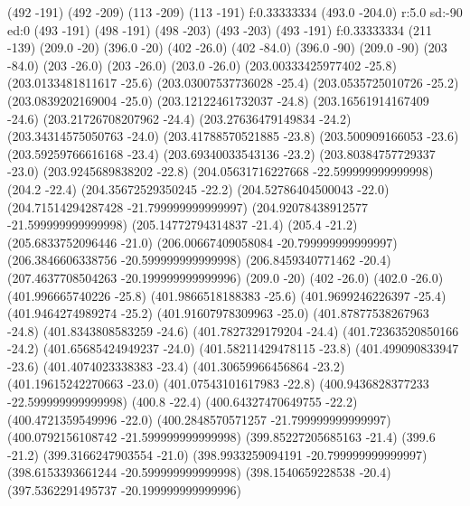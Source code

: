 {\lvec (492 -191)
\lvec (492 -209)
\lvec (113 -209)
\lvec (113 -191)
\lfill f:0.33333334
\move(493.0 -204.0)
\larc r:5.0 sd:-90 ed:0
\move (493 -191)
\lvec (498 -191)
\lvec (498 -203)
\lvec (493 -203)
\lvec (493 -191)
\lfill f:0.33333334
\htext (211 -139) {\matrixfontselect \color{white}{Array of Random Keys}}
\move (209.0 -20)
\lvec (396.0 -20)
\move (402 -26.0)
\lvec (402 -84.0)
\move (396.0 -90)
\lvec (209.0 -90)
\move (203 -84.0)
\lvec (203 -26.0)
\move (203 -26.0)
\lvec (203.0 -26.0)
\lvec (203.00333425977402 -25.8)
\lvec (203.0133481811617 -25.6)
\lvec (203.03007537736028 -25.4)
\lvec (203.0535725010726 -25.2)
\lvec (203.0839202169004 -25.0)
\lvec (203.12122461732037 -24.8)
\lvec (203.16561914167409 -24.6)
\lvec (203.21726708207962 -24.4)
\lvec (203.27636479149834 -24.2)
\lvec (203.34314575050763 -24.0)
\lvec (203.41788570521885 -23.8)
\lvec (203.500909166053 -23.6)
\lvec (203.59259766616168 -23.4)
\lvec (203.69340033543136 -23.2)
\lvec (203.80384757729337 -23.0)
\lvec (203.9245689838202 -22.8)
\lvec (204.05631716227668 -22.599999999999998)
\lvec (204.2 -22.4)
\lvec (204.35672529350245 -22.2)
\lvec (204.52786404500043 -22.0)
\lvec (204.71514294287428 -21.799999999999997)
\lvec (204.92078438912577 -21.599999999999998)
\lvec (205.14772794314837 -21.4)
\lvec (205.4 -21.2)
\lvec (205.6833752096446 -21.0)
\lvec (206.00667409058084 -20.799999999999997)
\lvec (206.3846606338756 -20.599999999999998)
\lvec (206.8459340771462 -20.4)
\lvec (207.4637708504263 -20.199999999999996)
\lvec (209.0 -20)
\move (402 -26.0)
\lvec (402.0 -26.0)
\lvec (401.996665740226 -25.8)
\lvec (401.9866518188383 -25.6)
\lvec (401.9699246226397 -25.4)
\lvec (401.9464274989274 -25.2)
\lvec (401.91607978309963 -25.0)
\lvec (401.87877538267963 -24.8)
\lvec (401.8343808583259 -24.6)
\lvec (401.7827329179204 -24.4)
\lvec (401.72363520850166 -24.2)
\lvec (401.65685424949237 -24.0)
\lvec (401.58211429478115 -23.8)
\lvec (401.499090833947 -23.6)
\lvec (401.4074023338383 -23.4)
\lvec (401.30659966456864 -23.2)
\lvec (401.19615242270663 -23.0)
\lvec (401.07543101617983 -22.8)
\lvec (400.9436828377233 -22.599999999999998)
\lvec (400.8 -22.4)
\lvec (400.64327470649755 -22.2)
\lvec (400.4721359549996 -22.0)
\lvec (400.2848570571257 -21.799999999999997)
\lvec (400.0792156108742 -21.599999999999998)
\lvec (399.85227205685163 -21.4)
\lvec (399.6 -21.2)
\lvec (399.3166247903554 -21.0)
\lvec (398.9933259094191 -20.799999999999997)
\lvec (398.6153393661244 -20.599999999999998)
\lvec (398.1540659228538 -20.4)
\lvec (397.5362291495737 -20.199999999999996)
}
